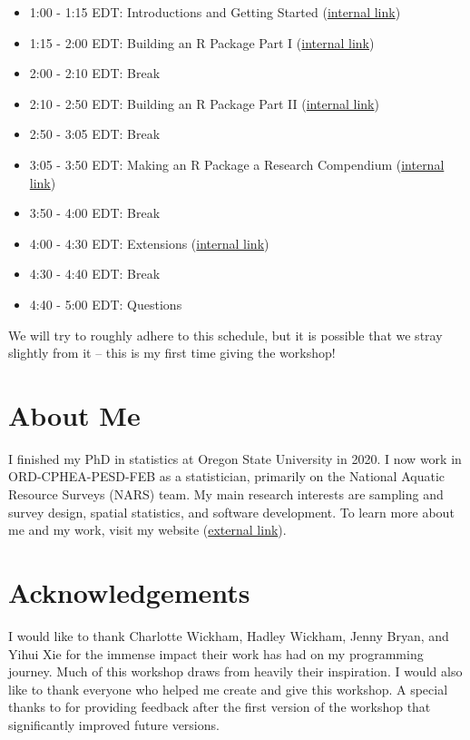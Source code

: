 \documentclass[
]{book}
\providecommand{\tightlist}{%
  \setlength{\itemsep}{0pt}\setlength{\parskip}{0pt}}
\begin{document}
\begin{itemize}
\tightlist
\item
  1:00 - 1:15 EDT: Introductions and Getting Started (\protect\hyperlink{getting-started}{internal link})
\item
  1:15 - 2:00 EDT: Building an R Package Part I (\protect\hyperlink{r-package}{internal link})
\item
  2:00 - 2:10 EDT: Break
\item
  2:10 - 2:50 EDT: Building an R Package Part II (\protect\hyperlink{r-package}{internal link})
\item
  2:50 - 3:05 EDT: Break
\item
  3:05 - 3:50 EDT: Making an R Package a Research Compendium (\protect\hyperlink{r-package-rc}{internal link})
\item
  3:50 - 4:00 EDT: Break
\item
  4:00 - 4:30 EDT: Extensions (\protect\hyperlink{extensions}{internal link})
\item
  4:30 - 4:40 EDT: Break
\item
  4:40 - 5:00 EDT: Questions
\end{itemize}

We will try to roughly adhere to this schedule, but it is possible that we stray slightly from it -- this is my first time giving the workshop!

\hypertarget{about-me}{%
\section*{About Me}\label{about-me}}

I finished my PhD in statistics at Oregon State University in 2020. I now work in ORD-CPHEA-PESD-FEB as a statistician, primarily on the National Aquatic Resource Surveys (NARS) team. My main research interests are sampling and survey design, spatial statistics, and software development. To learn more about me and my work, visit my website (\href{https://michaeldumelle.github.io/}{external link}).

\hypertarget{acknowledgements}{%
\section*{Acknowledgements}\label{acknowledgements}}

I would like to thank Charlotte Wickham, Hadley Wickham, Jenny Bryan, and Yihui Xie for the immense impact their work has had on my programming journey. Much of this workshop draws from heavily their inspiration. I would also like to thank everyone who helped me create and give this workshop. A special thanks to for providing feedback after the first version of the workshop that significantly improved future versions.
\end{document}
